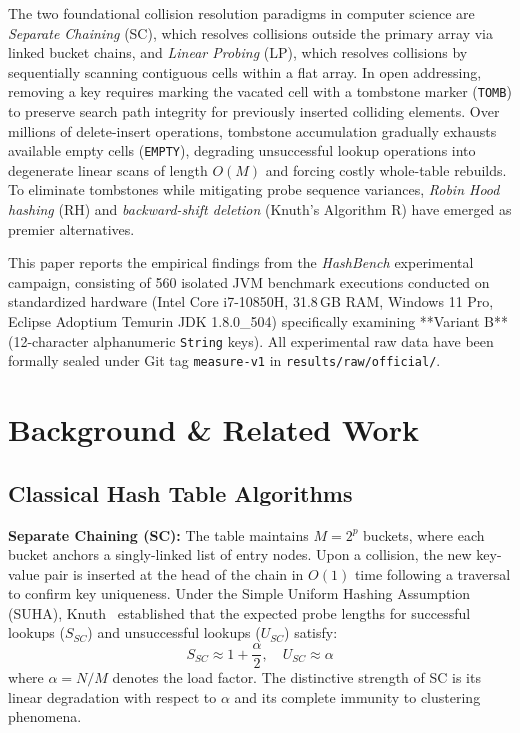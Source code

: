 \documentclass[twocolumn, 10pt, a4paper]{article}
\begin{document}
The two foundational collision resolution paradigms in computer science are \textit{Separate Chaining} (SC), which resolves collisions outside the primary array via linked bucket chains, and \textit{Linear Probing} (LP), which resolves collisions by sequentially scanning contiguous cells within a flat array. In open addressing, removing a key requires marking the vacated cell with a tombstone marker (\texttt{TOMB}) to preserve search path integrity for previously inserted colliding elements. Over millions of delete-insert operations, tombstone accumulation gradually exhausts available empty cells (\texttt{EMPTY}), degrading unsuccessful lookup operations into degenerate linear scans of length $O(M)$ and forcing costly whole-table rebuilds. To eliminate tombstones while mitigating probe sequence variances, \textit{Robin Hood hashing} (RH) and \textit{backward-shift deletion} (Knuth's Algorithm R) have emerged as premier alternatives.

This paper reports the empirical findings from the \textit{HashBench} experimental campaign, consisting of 560 isolated JVM benchmark executions conducted on standardized hardware (Intel Core i7-10850H, 31.8\,GB RAM, Windows 11 Pro, Eclipse Adoptium Temurin JDK 1.8.0\_504) specifically examining **Variant B** (12-character alphanumeric \texttt{String} keys). All experimental raw data have been formally sealed under Git tag \texttt{measure-v1} in \texttt{results/raw/official/}.

\section{Background \& Related Work}
\subsection{Classical Hash Table Algorithms}
\textbf{Separate Chaining (SC):} The table maintains $M = 2^p$ buckets, where each bucket anchors a singly-linked list of entry nodes. Upon a collision, the new key-value pair is inserted at the head of the chain in $O(1)$ time following a traversal to confirm key uniqueness. Under the Simple Uniform Hashing Assumption (SUHA), Knuth~\cite{knuth1998} established that the expected probe lengths for successful lookups ($S_{SC}$) and unsuccessful lookups ($U_{SC}$) satisfy:
\begin{equation}
S_{SC} \approx 1 + \frac{\alpha}{2}, \quad U_{SC} \approx \alpha
\end{equation}
where $\alpha = N/M$ denotes the load factor. The distinctive strength of SC is its linear degradation with respect to $\alpha$ and its complete immunity to clustering phenomena.
\end{document}
